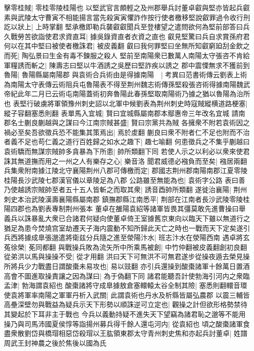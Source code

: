 擊零桂賊|{
	零桂零陵桂陽也}
以堅武官言頗輕之及州郡舉兵討董卓叡與堅亦皆起兵叡素與武陵太守曹寅不相能揚言當先殺寅寅懼詐作按行使者檄移堅說叡罪過令收行刑訖以狀上|{
	上時掌翻}
堅承檄即勒兵襲叡叡聞兵至登樓望之遣問欲何為堅前部答曰兵久戰勞苦欲詣使君求資直耳|{
	據吳錄資直者衣資之直也}
叡見堅驚曰兵自求賞孫府君何以在其中堅曰被使者檄誅君|{
	被皮義翻}
叡曰我何罪堅曰坐無所知叡窮廹刮金飲之而死|{
	陶弘景曰生金有毒不鍊服之殺人}
堅前至南陽衆已數萬人南陽太守張咨不肯給軍糧誘而斬之|{
	陳壽志曰堅以牛酒誘之吳歷曰堅詐疾以誘之}
郡中震慄無求不獲前到魯陽|{
	魯陽縣屬南陽郡}
與袁術合兵術由是得據南陽　|{
	考異曰范書術傳云劉表上術為南陽太守表傳云術阻兵屯魯陽表不得至荆州魏志術傳孫堅殺張咨術得據南陽魏武帝紀此年二月已云術屯南陽蓋術初奔魯陽此春孫堅取南陽術乃據之猶以魯陽為治所也}
表堅行破虜將軍領豫州刺史詔以北軍中候劉表為荆州刺史時寇賊縱横道路梗塞|{
	縱子容翻塞悉則翻}
表單馬入宜城|{
	賢曰宜城縣屬南郡本鄢惠帝三年改名宜城}
請南郡名士蒯良蒯越與之謀曰今江南宗賊甚盛|{
	賢曰宗黨共為賊}
各擁衆不附若袁術因之禍必至矣吾欲徵兵恐不能集其策焉出|{
	焉於䖍翻}
蒯良曰衆不附者仁不足也附而不治者義不足也苟仁義之道行百姓歸之如水之趣下|{
	趣七喻翻}
何患徵兵之不集乎蒯越曰袁術驕而無謀宗賊帥多貪暴為下所患|{
	帥所類翻下同}
若使人示之以利必以衆來使君誅其無道撫而用之一州之人有樂存之心|{
	樂音洛}
聞君威德必襁負而至矣|{
	襁居兩翻}
兵集衆附南據江陵北守襄陽荆州八郡可傳檄而定|{
	郡國志荆州郡南陽南郡江夏零陵桂陽長沙武陵七郡漢官儀以章陵足為八郡}
公路雖至無能為也|{
	袁術字公路}
表曰善乃使越誘宗賊帥至者五十五人皆斬之而取其衆|{
	誘音酉帥所類翻}
遂徙治襄陽|{
	荆州刺史本治武陵漢壽襄陽縣屬南郡}
鎮撫郡縣江南悉平|{
	荆部在江南者長沙武陵零陵桂陽四郡也為劉表專制荆州張本}
董卓在雒陽袁紹等諸軍皆畏其彊莫敢先進曹操曰舉義兵以誅暴亂大衆已合諸君何疑向使董卓倚王室據舊京東向以臨天下雖以無道行之猶足為患今焚燒宫室劫遷天子海内震動不知所歸此天亡之時也一戰而天下定矣遂引兵西將據成臯張邈遣將衛兹分兵隨之進至滎陽汴水|{
	班志汴水在滎陽西南}
遇卓將玄菟徐榮|{
	莬同都翻}
與戰操兵敗為流矢所中所乘馬被創|{
	中竹仲翻被皮義翻創初良翻}
從弟洪以馬與操操不受|{
	從才用翻}
洪曰天下可無洪不可無君遂步從操夜遁去榮見操所將兵少力戰盡日謂酸棗未易攻也|{
	易以豉翻}
亦引兵還操到酸棗諸軍十餘萬日置酒高會不圖進取操責讓之因為謀曰|{
	為于偽翻下同}
諸君能聽吾計使勃海引河内之衆臨孟津|{
	勃海謂袁紹也}
酸棗諸將守成臯據敖倉塞轘轅太谷全制其險|{
	塞悉則翻轘音環}
使袁將軍率南陽之軍軍丹析入武關|{
	此謂袁術也丹水及析縣皆屬弘農郡}
以震三輔皆高壘深壁勿與戰益為疑兵示天下形勢以順誅逆可立定也|{
	觀操之計但欲形格勢禁待其變起於下耳非主于戰也}
今兵以義動持疑不進失天下望竊為諸君恥之邈等不能用操乃與司馬沛國夏侯惇等詣揚州募兵得千餘人還屯河内|{
	從袁紹也}
頃之酸棗諸軍食盡衆散劉岱與橋瑁相惡岱殺瑁以王肱領東郡太守青州刺史焦和亦起兵討董卓|{
	姓譜周武王封神農之後於焦後以國為氏}
